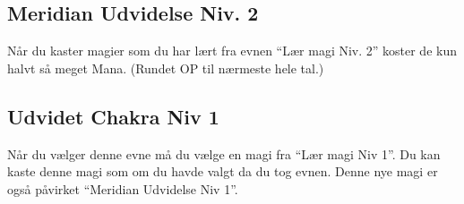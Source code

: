 \subsection{Meridian Udvidelse Niv. 2}
Når du kaster magier som du har lært fra evnen “Lær magi Niv. 2” koster de kun halvt så meget Mana. (Rundet OP til nærmeste hele tal.)

\subsection{Udvidet Chakra Niv 1}
Når du vælger denne evne må du vælge en magi fra “Lær magi Niv 1”. Du kan kaste denne magi som om du havde valgt da du tog evnen. Denne nye magi er også påvirket “Meridian Udvidelse Niv 1”.

